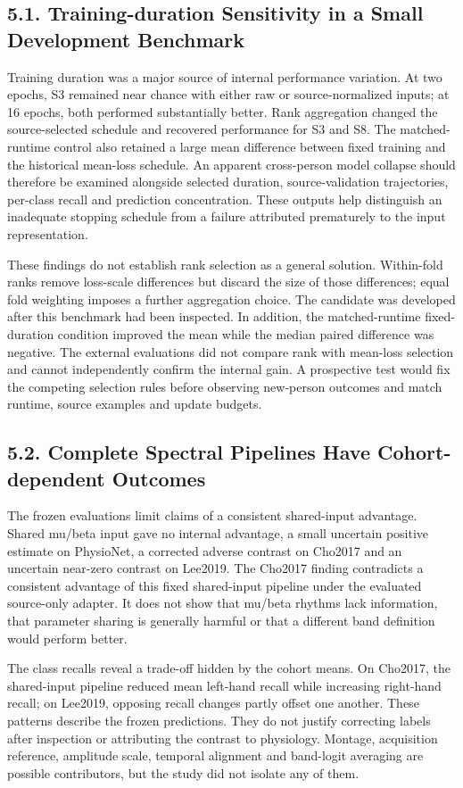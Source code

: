 \documentclass[11pt]{article}
\begin{document}
\subsection*{5.1. Training-duration Sensitivity in a Small Development Benchmark}
Training duration was a major source of internal performance variation. At two epochs, S3 remained near chance with either raw or source-normalized inputs; at 16 epochs, both performed substantially better. Rank aggregation changed the source-selected schedule and recovered performance for S3 and S8. The matched-runtime control also retained a large mean difference between fixed training and the historical mean-loss schedule. An apparent cross-person model collapse should therefore be examined alongside selected duration, source-validation trajectories, per-class recall and prediction concentration. These outputs help distinguish an inadequate stopping schedule from a failure attributed prematurely to the input representation.

These findings do not establish rank selection as a general solution. Within-fold ranks remove loss-scale differences but discard the size of those differences; equal fold weighting imposes a further aggregation choice. The candidate was developed after this benchmark had been inspected. In addition, the matched-runtime fixed-duration condition improved the mean while the median paired difference was negative. The external evaluations did not compare rank with mean-loss selection and cannot independently confirm the internal gain. A prospective test would fix the competing selection rules before observing new-person outcomes and match runtime, source examples and update budgets.

\subsection*{5.2. Complete Spectral Pipelines Have Cohort-dependent Outcomes}
The frozen evaluations limit claims of a consistent shared-input advantage. Shared mu/beta input gave no internal advantage, a small uncertain positive estimate on PhysioNet, a corrected adverse contrast on Cho2017 and an uncertain near-zero contrast on Lee2019. The Cho2017 finding contradicts a consistent advantage of this fixed shared-input pipeline under the evaluated source-only adapter. It does not show that mu/beta rhythms lack information, that parameter sharing is generally harmful or that a different band definition would perform better.

The class recalls reveal a trade-off hidden by the cohort means. On Cho2017, the shared-input pipeline reduced mean left-hand recall while increasing right-hand recall; on Lee2019, opposing recall changes partly offset one another. These patterns describe the frozen predictions. They do not justify correcting labels after inspection or attributing the contrast to physiology. Montage, acquisition reference, amplitude scale, temporal alignment and band-logit averaging are possible contributors, but the study did not isolate any of them.
\end{document}
